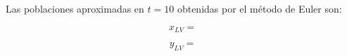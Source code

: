 \documentclass{article}
\begin{document}
Las poblaciones aproximadas en $t = 10$ obtenidas por el método de Euler son:

\begin{equation}
    x_{LV} =
    \label{eq:res:xlv}
\end{equation}

\begin{equation}
    y_{LV} =
    \label{eq:res:ylv}
\end{equation}
\end{document}
